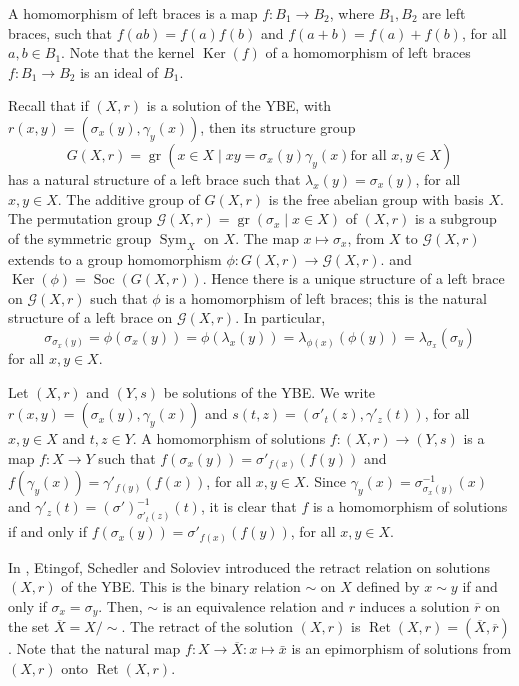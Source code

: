 \documentclass[10pt]{article}
\renewcommand{\ker}{\operatorname{Ker}}
\newcommand{\Sym}{\operatorname{Sym}}
\newcommand{\soc}{\operatorname{Soc}}
\newcommand{\Ret}{\operatorname{Ret}}
\newcommand{\gr}{\operatorname{gr}}
\begin{document}
A homomorphism of left braces is a map $f\colon B_1\longrightarrow
B_2$, where $B_1,B_2$ are left braces, such that $f(a b)=f(a)
f(b)$ and $f(a+b)=f(a)+f(b)$, for all $a,b\in B_1$. Note that the
kernel $\ker(f)$ of a homomorphism of left braces $f\colon
B_1\longrightarrow B_2$ is an ideal of $B_1$.


Recall that if $(X,r)$ is a solution of the YBE,
with
$r(x,y)=(\sigma_x(y),\gamma_y(x))$, then
its structure group
$$G(X,r)=\gr(x\in X\mid xy=\sigma_x(y)\gamma_y(x)\mbox{
for all }x,y\in
X)$$
has a natural structure of a left brace such that
$\lambda_x(y)=\sigma_x(y)$, for all $x,y\in X$. The additive group
of $G(X,r)$ is the free abelian group with basis $X$.
The permutation group $\mathcal{G}(X,r)=\gr(\sigma_x\mid x\in X)$ of
$(X,r)$ is a subgroup of the symmetric group $\Sym_X$ on $X$.
The
map $x\mapsto \sigma_x$, from $X$ to $\mathcal{G}(X,r)$ extends to
a group homomorphism $\phi: G(X,r)\longrightarrow
\mathcal{G}(X,r)$.
and $\ker(\phi)=\soc(G(X,r))$. Hence there is a
unique structure of a left brace on $\mathcal{G}(X,r)$ such that
$\phi$ is a homomorphism of left braces; this is the natural
structure of a left brace on $\mathcal{G}(X,r)$. In particular,
\begin{equation*}
    \sigma_{\sigma_x(y)}=\phi(\sigma_x(y))=\phi(\lambda_x(y))=\lambda_{\phi(x)}(\phi(y))=\lambda_{\sigma_x}(\sigma_y)
\end{equation*}
for all $x,y\in X$.

Let $(X,r)$ and $(Y,s)$ be solutions of the YBE. We write
$r(x,y)=(\sigma_x(y),\gamma_y(x))$ and
$s(t,z)=(\sigma'_t(z),\gamma'_z(t))$, for all $x,y\in X$ and $t,z\in
Y$. A homomorphism of solutions $f\colon (X,r)\longrightarrow (Y,s)$
is a map $f\colon X\longrightarrow Y$ such that
$f(\sigma_x(y))=\sigma'_{f(x)}(f(y))$ and
$f(\gamma_y(x))=\gamma'_{f(y)}(f(x))$, for all $x,y\in X$. Since
$\gamma_y(x)=\sigma^{-1}_{\sigma_x(y)}(x)$ and
$\gamma'_z(t)=(\sigma')^{-1}_{\sigma'_t(z)}(t)$, it is clear that
$f$ is a homomorphism of solutions if and only if
$f(\sigma_x(y))=\sigma'_{f(x)}(f(y))$, for all $x,y\in X$.


In \cite{ESS}, Etingof, Schedler and Soloviev introduced the
retract relation on solutions  $(X,r)$ of the YBE. This is the
binary relation $\sim$ on $X$ defined by $x\sim y$ if and only if
$\sigma_x=\sigma_y$. Then, $\sim$ is an equivalence relation and
$r$ induces a solution $\overline{r}$ on the set
$\overline{X}=X/{\sim}$. The retract of the solution $(X,r)$ is
$\Ret(X,r)=(\overline{X},\overline{r})$. Note that the natural map
$f\colon X\longrightarrow \overline{X}:x\mapsto \bar x$ is an
epimorphism of solutions from $(X,r)$ onto $\Ret(X,r)$.
\end{document}
